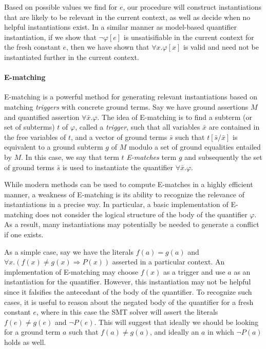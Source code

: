 \documentclass{llncs}
\begin{document}
Based on possible values we find for $e$, our procedure will construct instantiations that are likely to be relevant in the current context, as well as decide when no helpful instantiations exist.
In a similar manner as model-based quantifier instantiation, if we show that $\neg \varphi[e]$ is unsatisifiable in the current context for the fresh constant $e$, then we have shown that $\forall x. \varphi[x]$ is valid and need not be instantiated further in the current context.

\paragraph{E-matching}
E-matching is a powerful method for generating relevant instantiations based on matching \emph{triggers} with concrete ground terms. 
Say we have ground assertions $M$ and quantified assertion $\forall \bar{x}. \varphi$.
The idea of E-matching is to find a subterm (or set of subterms) $t$ of $\varphi$, called a \emph{trigger}, such that all variables $\bar{x}$ are contained in the free variables of $t$, and a vector of ground terms $\bar{s}$ such that $t[\bar{s}/\bar{x}]$ is equivalent to a ground subterm $g$ of $M$ modulo a set of ground equalities entailed by $M$.
In this case, we say that term $t$ \emph{E-matches} term $g$ and subsequently the set of ground terms $\bar{s}$ is used to instantiate the quantifier $\forall \bar{x}. \varphi$.

While modern methods can be used to compute E-matches in a highly efficient manner, a weakness of E-matching is its ability to recognize the relevance of instantiations in a precise way.
In particular, a basic implementation of E-matching does not consider the logical structure of the body of the quantifier $\varphi$.
As a result, many instantiations may potentially be needed to generate a conflict if one exists.

As a simple case, say we have the literals $f( a ) = g( a )$ and $\forall x. ( f(x) \neq g(x) \Rightarrow P( x ) )$ asserted in a particular context. 
An implementation of E-matching may choose $f( x )$ as a trigger and use $a$ as an instantiation for the quantifier.
However, this instantiation may not be helpful since it falsifies the antecedant of the body of the quantifier.
To recognize such cases, it is useful to reason about the negated body of the quantifier for a fresh constant $e$, where in this case the SMT solver will assert the literals $f( e ) \neq g( e )$ and $\neg P( e )$.
This will suggest that ideally we should be looking for a ground term $a$ such that $f( a ) \neq g( a )$, and ideally an $a$ in which $\neg P( a )$ holds as well.
\end{document}

